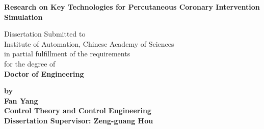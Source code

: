 
\thispagestyle{empty} %

\vspace*{0.5cm} %
\begin{center} \erhao \hei \textsf{\textbf{Research on Key Technologies for Percutaneous Coronary Intervention Simulation}}
\end{center}

\vspace*{0.5cm} %
\begin{center}
\sanhao Dissertation Submitted to\\
Institute of Automation, Chinese Academy of Sciences\\
in partial fulfillment of the requirements\\
for the degree of\\
\textsf{\textbf{Doctor of Engineering}}
\end{center}

\vspace{1.0cm}
\begin{center}
\textsf{\textbf{by}}\\
\textsf{\textbf{Fan Yang}}\\
\textsf{\textbf{Control Theory and Control Engineering}}\\
\vspace{1.0cm} \textsf{\textbf{Dissertation Supervisor: Zeng-guang Hou}}
\end{center}
